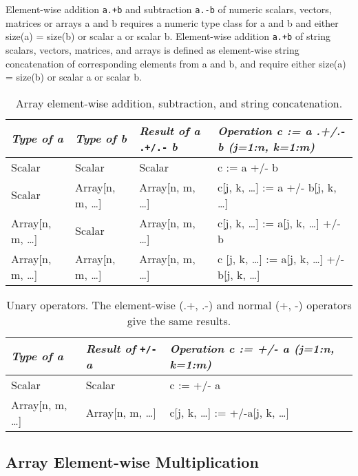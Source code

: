Element-wise addition \lstinline!a.+b! and subtraction \lstinline!a.-b! of numeric scalars,
vectors, matrices or arrays a and b requires a numeric type class for a
and b and either size(a) = size(b) or scalar a or scalar b. Element-wise
addition \lstinline!a.+b! of string scalars, vectors, matrices, and arrays is
defined as element-wise string concatenation of corresponding elements
from a and b, and require either size(a) = size(b) or scalar a or scalar
b.

\begin{longtable}[]{|l|l|l|l|}
\caption{Array element-wise addition, subtraction, and string concatenation.}\\
\hline
\emph{Type of a} & \emph{Type of b} & \emph{Result of a} \lstinline!.+/.-! \emph{b}
& \emph{Operation c := a .+/.- b (j=1:n, k=1:m)}\\ \hline
\endhead
Scalar & Scalar & Scalar & c := a +/- b\\ \hline
Scalar & Array{[}n, m, \ldots{}{]} & Array{[}n, m, \ldots{}{]} & c{[}j,
k, \ldots{}{]} := a +/- b{[}j, k, \ldots{}{]}\\ \hline
Array{[}n, m, \ldots{}{]} & Scalar & Array{[}n, m, \ldots{}{]} & c{[}j,
k, \ldots{}{]} := a{[}j, k, \ldots{}{]} +/- b\\ \hline
Array{[}n, m, \ldots{}{]} & Array{[}n, m, \ldots{}{]} & Array{[}n, m,
\ldots{}{]} & c {[}j, k, \ldots{}{]} := a{[}j, k, \ldots{}{]} +/- b{[}j,
k, \ldots{}{]}\\ \hline

\end{longtable}

\begin{longtable}[]{|l|l|l|}
\caption{Unary operators. The element-wise (.+, .-) and normal (+, -) operators give the same results.}\\
\hline
\emph{Type of a} & \emph{Result of} \lstinline!+/-! \emph{a} & \emph{Operation c :=
+/- a (j=1:n, k=1:m)}\\ \hline
\endhead
Scalar & Scalar & c := +/- a\\ \hline
Array{[}n, m, \ldots{}{]} & Array{[}n, m, \ldots{}{]} & c{[}j, k,
\ldots{}{]} := +/-a{[}j, k, \ldots{}{]}\\ \hline

\end{longtable}

\subsection{Array Element-wise Multiplication}

